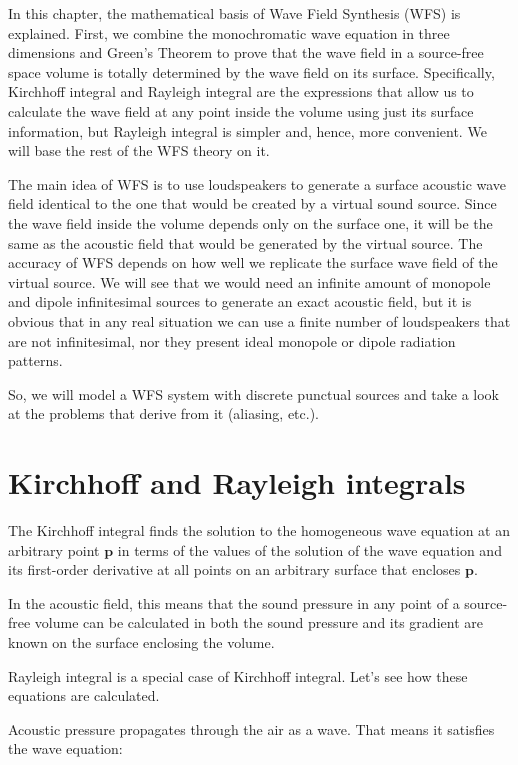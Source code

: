 In this chapter, the mathematical basis of Wave Field Synthesis (WFS) is explained. First, we combine the monochromatic wave equation in three dimensions and Green's Theorem to prove that the wave field in a source-free space volume is totally determined by the wave field on its surface. Specifically, Kirchhoff integral and Rayleigh integral are the expressions that allow us to calculate the wave field at any point inside the volume using just its surface information, but Rayleigh integral is simpler and, hence, more convenient. We will base the rest of the WFS theory on it.

The main idea of WFS is to use loudspeakers to generate a surface acoustic wave field identical to the one that would be created by a virtual sound source. Since the wave field inside the volume depends only on the surface one, it will be the same as the acoustic field that would be generated by the virtual source. The accuracy of WFS depends on how well we replicate the surface wave field of the virtual source. We will see that we would need an infinite amount of monopole and dipole infinitesimal sources to generate an exact acoustic field, but it is obvious that in any real situation we can use a finite number of loudspeakers that are not infinitesimal, nor they present ideal monopole or dipole radiation patterns. 

So, we will model a WFS system with discrete punctual sources and take a look at the problems that derive from it (aliasing, etc.).



\section{Kirchhoff and Rayleigh integrals}

The Kirchhoff integral finds the solution to the homogeneous wave equation at an arbitrary point $\mathbf{p}$ in terms of the values of the solution of the wave equation and its first-order derivative at all points on an arbitrary surface that encloses $\mathbf{p}$.

In the acoustic field, this means that the sound pressure in any point of a source-free volume can be calculated in both the sound pressure and its gradient are known on the surface enclosing the volume. 

Rayleigh integral is a special case of Kirchhoff integral. Let's see how these equations are calculated.

Acoustic pressure propagates through the air as a wave. That means it satisfies the wave equation:

